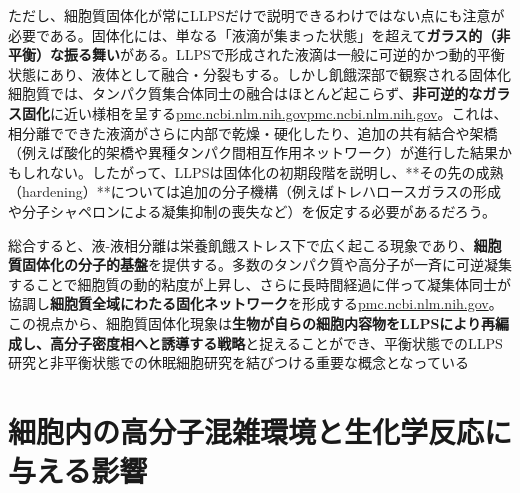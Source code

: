 ただし、細胞質固体化が常にLLPSだけで説明できるわけではない点にも注意が必要である。固体化には、単なる「液滴が集まった状態」を超えて\textbf{ガラス的（非平衡）な振る舞い}がある。LLPSで形成された液滴は一般に可逆的かつ動的平衡状態にあり、液体として融合・分裂もする。しかし飢餓深部で観察される固体化細胞質では、タンパク質集合体同士の融合はほとんど起こらず、\textbf{非可逆的なガラス固化}に近い様相を呈する\href{https://pmc.ncbi.nlm.nih.gov/articles/PMC6857596/\#:~:text=run\%20out\%20of\%20nutrients,2016\%20\%3B\%20\%2043}{pmc.ncbi.nlm.nih.gov}\href{https://pmc.ncbi.nlm.nih.gov/articles/PMC6857596/\#:~:text=virtually\%20no\%20motion\%2C\%20while\%20molecules,2016\%20\%3B\%20\%2043}{pmc.ncbi.nlm.nih.gov}。これは、相分離でできた液滴がさらに内部で乾燥・硬化したり、追加の共有結合や架橋（例えば酸化的架橋や異種タンパク間相互作用ネットワーク）が進行した結果かもしれない。したがって、LLPSは固体化の初期段階を説明し、**その先の成熟（hardening）**については追加の分子機構（例えばトレハロースガラスの形成や分子シャペロンによる凝集抑制の喪失など）を仮定する必要があるだろう。

総合すると、液-液相分離は栄養飢餓ストレス下で広く起こる現象であり、\textbf{細胞質固体化の分子的基盤}を提供する。多数のタンパク質や高分子が一斉に可逆凝集することで細胞質の動的粘度が上昇し、さらに長時間経過に伴って凝集体同士が協調し\textbf{細胞質全域にわたる固化ネットワーク}を形成する\href{https://pmc.ncbi.nlm.nih.gov/articles/PMC4850707/\#:~:text=match\%20at\%20L1536\%20agreement\%20with,have\%20to\%20determine\%20the\%20molecular}{pmc.ncbi.nlm.nih.gov}。この視点から、細胞質固体化現象は\textbf{生物が自らの細胞内容物をLLPSにより再編成し、高分子密度相へと誘導する戦略}と捉えることができ、平衡状態でのLLPS研究と非平衡状態での休眠細胞研究を結びつける重要な概念となっている



\section{細胞内の高分子混雑環境と生化学反応に与える影響}


